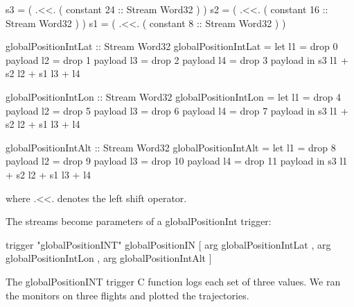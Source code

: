 \begin{code}
s3 = ( .<<. ( constant 24 :: Stream Word32 ) )
s2 = ( .<<. ( constant 16 :: Stream Word32 ) )
s1 = ( .<<. ( constant 8  :: Stream Word32 ) )

globalPositionIntLat :: Stream Word32
globalPositionIntLat = let l1 = drop 0 payload
                           l2 = drop 1 payload
                           l3 = drop 2 payload
                           l4 = drop 3 payload
                       in s3 l1 + s2 l2 + s1 l3 + l4

globalPositionIntLon :: Stream Word32
globalPositionIntLon = let l1 = drop 4 payload
                           l2 = drop 5 payload
                           l3 = drop 6 payload
                           l4 = drop 7 payload
                       in s3 l1 + s2 l2 + s1 l3 + l4

globalPositionIntAlt :: Stream Word32
globalPositionIntAlt = let l1 = drop 8  payload
                           l2 = drop 9  payload
                           l3 = drop 10 payload
                           l4 = drop 11 payload
                       in s3 l1 + s2 l2 + s1 l3 + l4
\end{code}
where $\texttt{.<<.}$ denotes the left shift operator. 

The streams become parameters of a globalPositionInt trigger:

\begin{code}
trigger "globalPositionINT" globalPositionIN
                  [ arg globalPositionIntLat
                  , arg globalPositionIntLon
                  , arg globalPositionIntAlt ]
\end{code}

The globalPositionINT trigger C function logs each set of three values. We ran
the monitors on three flights and plotted the trajectories.

